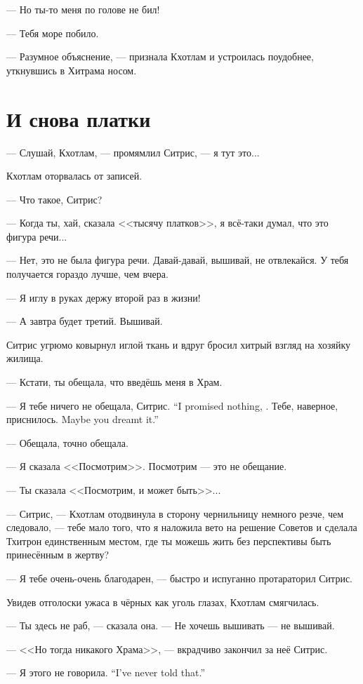 --- Но ты-то меня по голове не бил!

--- Тебя море побило.

--- Разумное объяснение, --- признала Кхотлам и устроилась поудобнее, уткнувшись в Хитрама носом.

\section{И снова платки}

--- Слушай, Кхотлам, --- промямлил Ситрис, --- я тут это...

Кхотлам оторвалась от записей.

--- Что такое, Ситрис?

--- Когда ты, хай, сказала <<тысячу платков>>, я всё-таки думал, что это фигура речи...

--- Нет, это не была фигура речи.
Давай-давай, вышивай, не отвлекайся.
У тебя получается гораздо лучше, чем вчера.

--- Я иглу в руках держу второй раз в жизни!

--- А завтра будет третий.
Вышивай.

Ситрис угрюмо ковырнул иглой ткань и вдруг бросил хитрый взгляд на хозяйку жилища.

--- Кстати, ты обещала, что введёшь меня в Храм.

{--- Я тебе ничего не обещала, Ситрис.}
{``I promised nothing, \Sitris.}
{Тебе, наверное, приснилось.}
{Maybe you dreamt it.''}

--- Обещала, точно обещала.

--- Я сказала <<Посмотрим>>.
Посмотрим --- это не обещание.

--- Ты сказала <<Посмотрим, и может быть>>...

--- Ситрис, --- Кхотлам отодвинула в сторону чернильницу немного резче, чем следовало, --- тебе мало того, что я наложила вето на решение Советов и сделала Тхитрон единственным местом, где ты можешь жить без перспективы быть принесённым в жертву?

--- Я тебе очень-очень благодарен, --- быстро и испуганно протараторил Ситрис.

Увидев отголоски ужаса в чёрных как уголь глазах, Кхотлам смягчилась.

--- Ты здесь не раб, --- сказала она.
--- Не хочешь вышивать --- не вышивай.

--- <<Но тогда никакого Храма>>, --- вкрадчиво закончил за неё Ситрис.

{--- Я этого не говорила.}
{``I've never told that.''}

